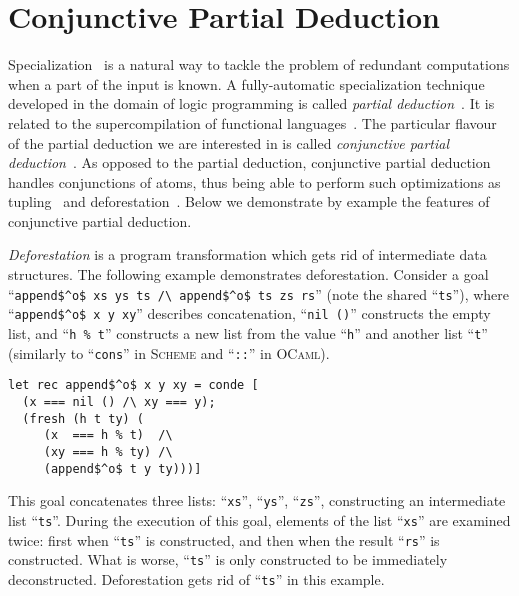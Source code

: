 \section{Conjunctive Partial Deduction}
\label{sec:cpd}
Specialization~\cite{jones1993partial} is a natural way to tackle the problem of redundant computations when a part of the input is known. 
A fully-automatic specialization technique developed in the domain of logic programming is called \emph{partial deduction}~\cite{komorowski1982partial, lloyd1991partial}. 
It is related to the supercompilation of functional languages~\cite{gluck1994partial, turchin1986concept}. 
The particular flavour of the partial deduction we are interested in is called \emph{conjunctive partial deduction}~\cite{de1999conjunctive}.
As opposed to the partial deduction, conjunctive partial deduction handles  conjunctions of atoms, thus being able to perform such optimizations as tupling~\cite{hu1997tupling} and deforestation~\cite{wadler1988deforestation}.
Below we demonstrate by example the features of conjunctive partial deduction.

\emph{Deforestation} is a program transformation which gets rid of intermediate data structures. 
The following example demonstrates deforestation. 
Consider a goal ``\lstinline{append$^o$ xs ys ts /\ append$^o$ ts zs rs}'' (note the shared ``\lstinline{ts}''), where ``\lstinline{append$^o$ x y xy}'' describes concatenation, ``\lstinline{nil ()}'' constructs the empty list, and ``\lstinline{h % t}'' constructs a new list from the value ``\lstinline{h}'' and another list ``\lstinline{t}'' (similarly to ``\lstinline{cons}'' in \textsc{Scheme} and ``\lstinline{::}'' in \textsc{OCaml}).

\begin{lstlisting}[label={cpd:appendo}]
let rec append$^o$ x y xy = conde [
  (x === nil () /\ xy === y);
  (fresh (h t ty) (
     (x  === h % t)  /\  
     (xy === h % ty) /\
     (append$^o$ t y ty)))]
\end{lstlisting}

This goal concatenates three lists: ``\lstinline{xs}'', ``\lstinline{ys}'', ``\lstinline{zs}'', constructing an intermediate list ``\lstinline{ts}''. During the execution of this goal, elements of the list ``\lstinline{xs}'' are examined twice: first when ``\lstinline{ts}'' is constructed, and then when the result ``\lstinline{rs}'' is constructed. What is worse, ``\lstinline{ts}'' is only constructed to be immediately deconstructed. Deforestation gets rid of ``\lstinline{ts}'' in this example.  

